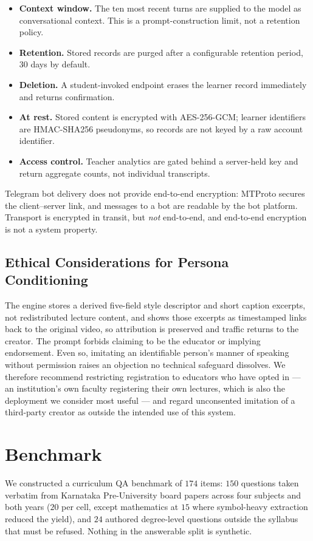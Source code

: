 \documentclass[conference]{IEEEtran}
\begin{document}
\begin{itemize}
\item \textbf{Context window.} The ten most recent turns are supplied to the
model as conversational context. This is a prompt-construction limit, not a
retention policy.
\item \textbf{Retention.} Stored records are purged after a configurable
retention period, $30$ days by default.
\item \textbf{Deletion.} A student-invoked endpoint erases the learner record
immediately and returns confirmation.
\item \textbf{At rest.} Stored content is encrypted with AES-256-GCM; learner
identifiers are HMAC-SHA256 pseudonyms, so records are not keyed by a raw
account identifier.
\item \textbf{Access control.} Teacher analytics are gated behind a server-held
key and return aggregate counts, not individual transcripts.
\end{itemize}

Telegram bot delivery does not provide end-to-end encryption: MTProto secures the
client--server link, and messages to a bot are readable by the bot platform.
Transport is encrypted in transit, but \emph{not} end-to-end, and end-to-end encryption is not a system property.

\subsection{Ethical Considerations for Persona Conditioning}
\label{sec:ethics}
The engine
stores a derived five-field style descriptor and short caption excerpts, not
redistributed lecture content, and shows those excerpts as timestamped links
back to the original video, so attribution is preserved and traffic returns to
the creator. The prompt forbids claiming to be the educator or implying
endorsement. Even so, imitating an identifiable person's manner of speaking
without permission raises an objection no technical safeguard dissolves. We
therefore recommend restricting registration to educators who have opted in ---
an institution's own faculty registering their own lectures, which is also the
deployment we consider most useful --- and regard unconsented imitation of a
third-party creator as outside the intended use of this system.

\section{Benchmark}
We constructed a curriculum QA benchmark of
$174$ items: $150$ questions taken verbatim from Karnataka Pre-University board
papers across four subjects and both years ($20$ per cell, except mathematics
at $15$ where symbol-heavy extraction reduced the yield), and $24$ authored
degree-level questions outside the syllabus that must be refused. Nothing in
the answerable split is synthetic.
\end{document}
